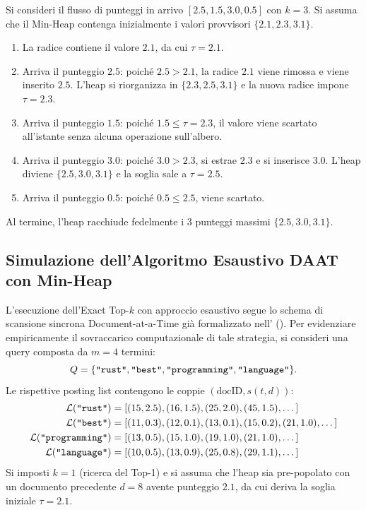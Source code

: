 \begin{example}
Si consideri il flusso di punteggi in arrivo $[2.5, 1.5, 3.0, 0.5]$ con $k = 3$.  
Si assuma che il Min-Heap contenga inizialmente i valori provvisori $\{2.1, 2.3, 3.1\}$.
\begin{enumerate}
    \item La radice contiene il valore $2.1$, da cui $\tau = 2.1$.
    \item Arriva il punteggio $2.5$: poich\'e $2.5 > 2.1$, la radice $2.1$ viene rimossa e viene inserito $2.5$. L'heap si riorganizza in $\{2.3, 2.5, 3.1\}$ e la nuova radice impone $\tau = 2.3$.
    \item Arriva il punteggio $1.5$: poich\'e $1.5 \le \tau = 2.3$, il valore viene scartato all'istante senza alcuna operazione sull'albero.
    \item Arriva il punteggio $3.0$: poich\'e $3.0 > 2.3$, si estrae $2.3$ e si inserisce $3.0$. L'heap diviene $\{2.5, 3.0, 3.1\}$ e la soglia sale a $\tau = 2.5$.
    \item Arriva il punteggio $0.5$: poich\'e $0.5 \le 2.5$, viene scartato.
\end{enumerate}
Al termine, l'heap racchiude fedelmente i 3 punteggi massimi $\{2.5, 3.0, 3.1\}$.
\end{example}

\FloatBarrier
\subsection{Simulazione dell'Algoritmo Esaustivo DAAT con Min-Heap}
L'esecuzione dell'Exact Top-$k$ con approccio esaustivo segue lo schema di scansione sincrona Document-at-a-Time gi\`a formalizzato nell'\textbf{} ().  
Per evidenziare empiricamente il sovraccarico computazionale di tale strategia, si consideri una query composta da $m = 4$ termini:
\begin{equation*}
    Q = \{\text{\texttt{"rust"}}, \text{\texttt{"best"}}, \text{\texttt{"programming"}}, \text{\texttt{"language"}}\}.
\end{equation*}
Le rispettive posting list contengono le coppie $(\text{docID}, s(t, d))$:
\begin{align*}
    \mathcal{L}(\text{\texttt{"rust"}}) &= [(15, 2.5), (16, 1.5), (25, 2.0), (45, 1.5), \dots] \\
    \mathcal{L}(\text{\texttt{"best"}}) &= [(11, 0.3), (12, 0.1), (13, 0.1), (15, 0.2), (21, 1.0), \dots] \\
    \mathcal{L}(\text{\texttt{"programming"}}) &= [(13, 0.5), (15, 1.0), (19, 1.0), (21, 1.0), \dots] \\
    \mathcal{L}(\text{\texttt{"language"}}) &= [(10, 0.5), (13, 0.9), (25, 0.8), (29, 1.1), \dots]
\end{align*}
Si imposti $k = 1$ (ricerca del Top-1) e si assuma che l'heap sia pre-popolato con un documento precedente $d = 8$ avente punteggio $2.1$, da cui deriva la soglia iniziale $\tau = 2.1$.

